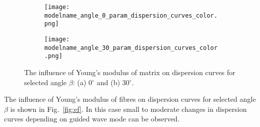 \documentclass[preprint,12pt]{elsarticle}
\begin{document}
\begin{figure} [h!]
	\centering
	\newcommand{\modelname}{SASE4_plain_weave}
	\begin{subfigure}[b]{0.49\textwidth}
		\centering
		\texttt{[image: \\modelname\_angle\_0\_param\_dispersion\_curves\_color.png]}
		\caption{}
		\label{fig:em0}
	\end{subfigure}
	\hfill
	\begin{subfigure}[b]{0.49\textwidth}
		\centering
		\texttt{[image: \\modelname\_angle\_30\_param\_dispersion\_curves\_color.png]}
		\caption{}
		\label{fig:em30}
	\end{subfigure}
	\caption{The influence of Young's modulus of matrix  on dispersion curves for selected angle $\beta$: (a) 0$^{\circ}$ and (b) 30$^{\circ}$.} 
	\label{fig:em}
\end{figure}

The influence of Young's modulus of fibres on dispersion curves for selected angle $\beta$ is shown in Fig.~\ref{fig:ef}. In this case small to moderate changes in dispersion curves depending on guided wave mode can be observed. 
\end{document}
